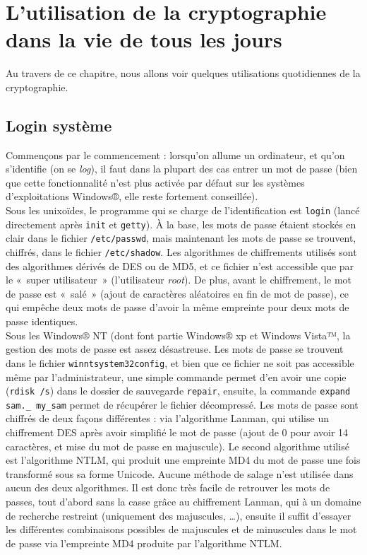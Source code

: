 \section{L'utilisation de la cryptographie dans la vie de tous les
jours}
Au travers de ce chapitre, nous allons voir quelques utilisations
quotidiennes de la cryptographie.

\subsection{Login système}
Commençons par le commencement : lorsqu'on allume un ordinateur,
et qu'on s'identifie (on se \emph{log}), il faut dans la plupart
des cas entrer un mot de passe (bien que cette fonctionnalité
n'est plus activée par défaut sur les systèmes d'exploitations
Windows®, elle reste fortement conseillée). 
\\

Sous les unixoïdes, le programme qui se charge de
l'identification est \texttt{login} (lancé directement après
\texttt{init} et \texttt{getty}). À la base, les mots de passe
étaient stockés en clair dans le fichier \texttt{/etc/passwd},
mais maintenant les mots de passe se trouvent, chiffrés, dans le 
fichier \texttt{/etc/shadow}. Les algorithmes de chiffrements
utilisés sont des algorithmes dérivés de DES ou de MD5, et ce
fichier n'est accessible que par le «~super utilisateur~»
(l'utilisateur \emph{root}). De plus, avant le chiffrement, le mot
de passe est «~salé~» (ajout de caractères aléatoires en fin de
mot de passe), ce qui empêche deux mots de passe d'avoir
la même empreinte pour deux mots de passe identiques.
\\

Sous les Windows® NT (dont font partie Windows® xp et Windows
Vista™, la gestion des mots de passe est assez désastreuse. Les
mots de passe se trouvent dans le fichier
\texttt{\bslash winnt\bslash system32\bslash config}, et bien 
que ce fichier ne soit pas
accessible même par l'administrateur, une simple commande permet
d'en avoir une copie (\texttt{rdisk /s}) dans le dossier de
sauvegarde \texttt{repair}, ensuite, la commande \texttt{expand
sam.\_ my\_sam} 
permet de récupérer le fichier décompressé.
Les mots de passe sont chiffrés de deux façons différentes : via
l'algorithme Lanman, qui utilise un chiffrement DES après avoir
simplifié le mot de passe (ajout de 0 pour avoir 14 caractères, et
mise du mot de passe en majuscule). 
Le second algorithme utilisé est l'algorithme NTLM, qui produit
une empreinte MD4 du mot de passe une fois transformé sous sa
forme Unicode. Aucune méthode de salage n'est utilisée dans aucun
des deux algorithmes. Il est donc très facile de retrouver les
mots de passes, tout d'abord sans la casse grâce au chiffrement
Lanman, qui à un domaine de recherche restreint (uniquement des
majuscules, …), ensuite il suffit d'essayer les différentes
combinaisons possibles de majuscules et de minuscules dans le mot
de passe via l'empreinte MD4 produite par l'algorithme NTLM.
\\

